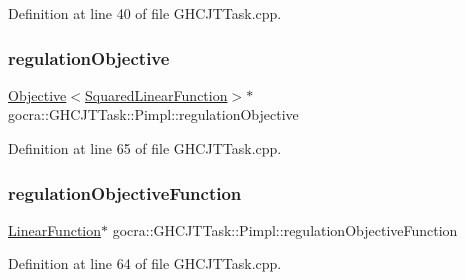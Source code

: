 Definition at line 40 of file G\+H\+C\+J\+T\+Task.\+cpp.

\hypertarget{structgocra_1_1GHCJTTask_1_1Pimpl_a59fe897e1cfa0a5b28a52f0d1be7d13d}{}\label{structgocra_1_1GHCJTTask_1_1Pimpl_a59fe897e1cfa0a5b28a52f0d1be7d13d} 
\subsubsection{\texorpdfstring{regulation\+Objective}{regulationObjective}}
{\footnotesize\ttfamily \hyperlink{classocra_1_1Objective}{Objective}$<$\hyperlink{classocra_1_1SquaredLinearFunction}{Squared\+Linear\+Function}$>$$\ast$ gocra\+::\+G\+H\+C\+J\+T\+Task\+::\+Pimpl\+::regulation\+Objective}



Definition at line 65 of file G\+H\+C\+J\+T\+Task.\+cpp.

\hypertarget{structgocra_1_1GHCJTTask_1_1Pimpl_a74195cf444c7ab8673985cf9cd7de28d}{}\label{structgocra_1_1GHCJTTask_1_1Pimpl_a74195cf444c7ab8673985cf9cd7de28d} 
\subsubsection{\texorpdfstring{regulation\+Objective\+Function}{regulationObjectiveFunction}}
{\footnotesize\ttfamily \hyperlink{classocra_1_1LinearFunction}{Linear\+Function}$\ast$ gocra\+::\+G\+H\+C\+J\+T\+Task\+::\+Pimpl\+::regulation\+Objective\+Function}



Definition at line 64 of file G\+H\+C\+J\+T\+Task.\+cpp.

\hypertarget{structgocra_1_1GHCJTTask_1_1Pimpl_ab0953e75c824e2aa63477976b94a1806}{}\label{structgocra_1_1GHCJTTask_1_1Pimpl_ab0953e75c824e2aa63477976b94a1806} 
